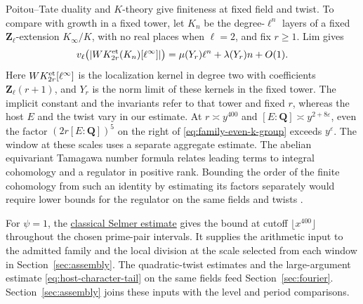Poitou--Tate duality and \(K\)-theory give finiteness at fixed field
and twist. To compare with growth in a fixed tower, let \(K_n\)
be the degree-\(\ell^n\) layers of a fixed
\(\mathbf Z_\ell\)-extension \(K_\infty/K\), with no real places
when \(\ell=2\), and fix \(r\ge1\).
Lim gives
\[
 v_\ell\!\left(|WK_{2r}^{\rm et}(K_n)[\ell^\infty]|\right)
      =\mu(Y_r)\ell^n+\lambda(Y_r)n+O(1).
\]
Here \(WK_{2r}^{\rm et}[\ell^\infty]\) is the localization kernel
in degree two with coefficients \(\mathbf Z_\ell(r+1)\), and
\(Y_r\) is the norm limit of these kernels in the fixed tower.
The implicit constant and the invariants refer to that tower and
fixed \(r\), whereas the host \(E\) and the twist vary in our
estimate. \cite[arXiv v2, Proposition~5.1, p.~20]{f1lim-wild}
At \(r\asymp y^{400}\) and \([E:\mathbf Q]\asymp y^{2+8\varepsilon}\),
even the factor \((2r[E:\mathbf Q])^5\) on the right of
\eqref{eq:family-even-k-group} exceeds \(y^\varepsilon\).
The window at these scales uses a separate aggregate estimate.
The abelian equivariant Tamagawa number formula relates leading
terms to integral cohomology and a regulator in positive rank.
Bounding the order of the finite cohomology from such an identity
by estimating its factors separately would require lower bounds
for the regulator on the same fields and twists
\cite[Corollary~1.2]{f1burns-flach}
\cite[\S5.4, (26)]{f1soule-torsion}.

For \(\psi=1\), the
\hyperlink{proof.selmer-classical-residual}{classical Selmer estimate}
gives the bound at cutoff \(\lfloor x^{400}\rfloor\) throughout the
chosen prime-pair intervals. It supplies the arithmetic input to the
admitted family and the local division at the scale selected from
each window in Section~\ref{sec:assembly}. The quadratic-twist
estimates and the large-argument estimate \eqref{eq:host-character-tail}
on the same fields feed Section~\ref{sec:fourier}.
Section~\ref{sec:assembly} joins these inputs with the level and period
comparisons.
